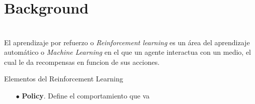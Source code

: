 \chapter{Background}


\chapter{}
El aprendizaje por refuerzo o \textit{Reinforcement learning} es un área del aprendizaje automático o \textit{Machine Learning} en el que un agente interactua con un medio, el cual le da recompensas en funcion de sus acciones.

Elementos del Reinforcement Learning \cite{sutton2018reinforcement}
\begin{itemize}
	\item[$\bullet$] \textbf{Policy}. Define el comportamiento que va 
\end{itemize}